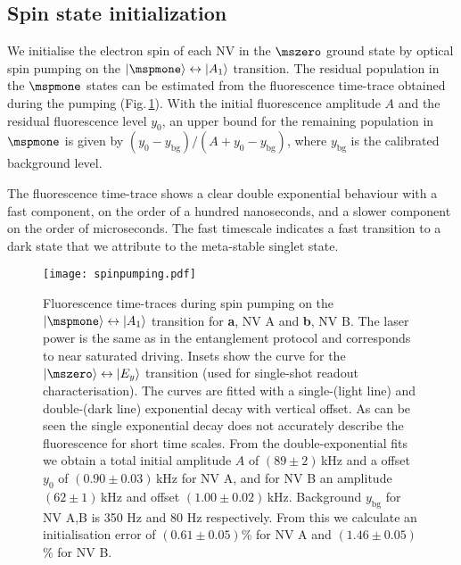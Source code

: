 \subsection{Spin state initialization}
We initialise the electron spin of each NV in the $\mszero$ ground state by optical spin pumping on the $\ket{\mspmone}\leftrightarrow\ket{A_1}$ transition. The residual population in the $\mspmone$ states can be estimated from the fluorescence time-trace obtained during the pumping (Fig.\,\ref{fig:spinpumping}). With the initial fluorescence amplitude $A$ and the residual fluorescence level $y_0$, an upper bound for the remaining population in $\mspmone$ is given by $(y_0-y_{\mathrm{bg}})/(A+y_0-y_{\mathrm{bg}})$, where $y_{\mathrm{bg}}$ is the calibrated background level\cite{Robledo:2011fs}.

The fluorescence time-trace shows a clear double exponential behaviour with a fast component, on the order of a hundred nanoseconds, and a slower component on the order of microseconds. The fast timescale indicates a fast transition to a dark state that we attribute to the meta-stable singlet state.

\begin{figure}[h]
\centering
\texttt{[image: spinpumping.pdf]}
\caption{Fluorescence time-traces during spin pumping on the $\ket{\mspmone}\leftrightarrow\ket{A_1}$ transition for \textbf{a}, NV A and \textbf{b}, NV B. The laser power is the same as in the entanglement protocol and corresponds to near saturated driving. Insets show the curve for the $\ket{\mszero}\leftrightarrow\ket{E_y}$ transition (used for single-shot readout characterisation). The curves are fitted with a single-(light line) and double-(dark line) exponential decay with vertical offset. As can be seen the single exponential decay does not accurately describe the fluorescence for short time scales. From the double-exponential fits we obtain a total initial amplitude $A$ of $(89 \pm 2)$\,kHz and a offset $y_0$ of $(0.90 \pm 0.03)$\,kHz for NV A, and for NV B an amplitude $(62 \pm 1)$\,kHz and offset $(1.00 \pm 0.02)$\,kHz. Background $y_{\mathrm{bg}}$ for NV A,B is 350 Hz and 80 Hz respectively. From this we calculate an initialisation error of $(0.61 \pm 0.05)$\% for NV A and $(1.46 \pm 0.05)$\% for NV B. }
\label{fig:spinpumping}
\end{figure}

